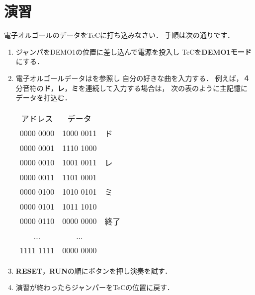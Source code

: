 \section*{演習}

電子オルゴールのデータをTeCに打ち込みなさい．
手順は次の通りです．

\begin{enumerate}
\item ジャンパをDEMO1の位置に差し込んで電源を投入し
TeCを{\bf DEMO1モード}にする．
\item 電子オルゴールデータはを参照し
自分の好きな曲を入力する．
例えば，４分音符の{\bf ド}，{\bf レ}，{\bf ミ}を連続して入力する場合は，
次の表のように主記憶にデータを打込む．

{\tt\small\begin{center}
\begin{tabular}{| c | c | l }\cline{1-2}
アドレス  & データ \\\cline{1-2}
0000 0000 & 1000 0011 & ド   \\
0000 0001 & 1110 1000 &      \\
0000 0010 & 1001 0011 & レ   \\
0000 0011 & 1101 0001 &      \\
0000 0100 & 1010 0101 & ミ   \\
0000 0101 & 1011 1010 &      \\
0000 0110 & 0000 0000 & 終了 \\
  ...     &   ...     &      \\
1111 1111 & 0000 0000 &      \\\cline{1-2}
\end{tabular}
\end{center}}

\item {\bf RESET}，{\bf RUN}の順にボタンを押し演奏を試す．

\item 演習が終わったらジャンパーをTeCの位置に戻す．
\end{enumerate}
